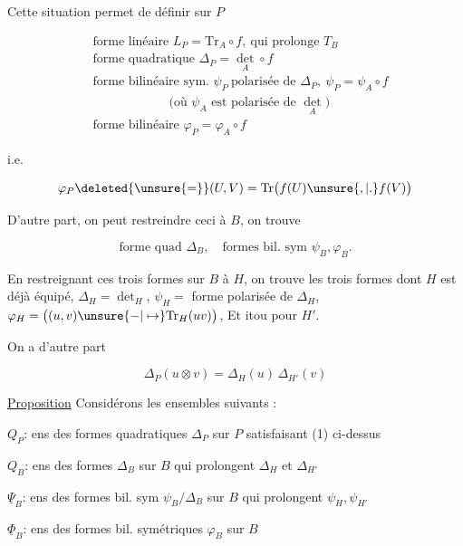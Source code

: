
Cette situation permet de définir
sur $P$

\[
\begin{aligned}
&\text{forme linéaire }L_P=\mathrm{Tr}_A\circ f,\ \text{qui prolonge }T_B\\
&\text{forme quadratique }\Delta_P=\det_A\circ f\\
&\text{forme bilinéaire sym. }\psi_P\ \text{polarisée de }\Delta_P,\ \psi_P=\psi_A\circ f\\
&\hspace{6em}\text{(où }\psi_A\text{ est polarisée de }\det_A\text{)}\\
&\text{forme bilinéaire }\varphi_P=\varphi_A\circ f
\end{aligned}
\]

i.e.

\[
\varphi_P\deleted{\unsure{=}}(U,V)=\mathrm{Tr}\bigl(f(U)\unsure{,|.}f(V)\bigr)
\]


D'autre part, on peut restreindre ceci
à $B$, on trouve

\[
\text{forme quad }\Delta_B,\quad\text{formes bil. sym }\psi_B,\varphi_B.
\]

En restreignant ces trois formes sur
$B$ à $H$, on trouve les trois formes
dont $H$ est déjà équipé, $\Delta_H=\det_H$, $\psi_H=$ forme
polarisée de $\Delta_H$, $\varphi_H=\bigl((u,v)\unsure{-|\mapsto}\mathrm{Tr}_H(uv)\bigr)$, Et
itou pour $H'$.

On a d'autre part

\[
\Delta_P(u\otimes v)=\Delta_H(u)\,\Delta_{H'}(v) \tag*{(1)}
\]

\uline{Proposition}  Considérons les   ensembles
suivants :

$Q_P$:  ens des formes quadratiques $\Delta_P$ sur $P$ satisfaisant
(1) ci-dessus

$Q_B$:  ens des formes   $\Delta_B$ sur $B$ qui
prolongent $\Delta_H$ et $\Delta_{H'}$

$\underline{\Psi}_B$: \deleted{$(\unsure{\psi})$} ens des formes bil. sym $\psi_B/\Delta_B$ sur $B$
qui prolongent $\psi_H,\psi_{H'}$

$\underline{\Phi}_B$: \deleted{$(\varphi)$} ens des formes bil. symétriques $\varphi_B$ sur $B$

